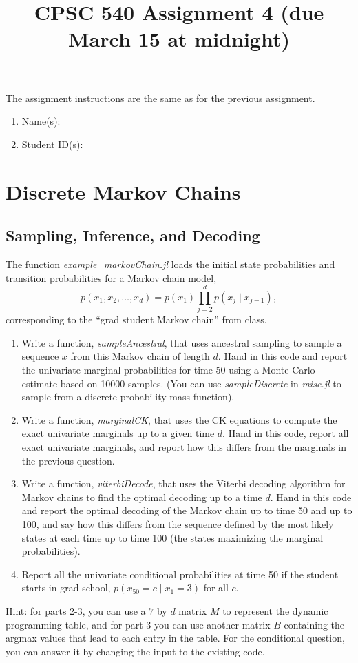 \documentclass{article}
\def\blu#1{{\color{blu}#1}}
\def\cond{\; | \;}
\def\enum#1{\begin{enumerate}#1\end{enumerate}}
\begin{document}
\title{CPSC 540 Assignment 4 (due March 15 at midnight)}
\author{}
\date{}
\maketitle
\vspace{-4em}


The assignment instructions are the same as for the previous assignment.


\blu{\enum{
\item Name(s):
\item Student ID(s):
}}



\section{Discrete Markov Chains}

\subsection{Sampling, Inference, and Decoding}

The function \emph{example\_markovChain.jl} loads the initial state probabilities and transition probabilities for a Markov chain model,
\[
p(x_1,x_2,\dots,x_d) = p(x_1)\prod_{j=2}^{d}{p(x_j\cond x_{j-1})},
\]
corresponding to the ``grad student Markov chain'' from class.

\enum{
\item Write a function, \emph{sampleAncestral}, that uses ancestral sampling to sample a sequence $x$ from this Markov chain of length $d$. \blu{Hand in this code and report the univariate marginal probabilities for time 50 using a Monte Carlo estimate based on 10000 samples.} (You can use \emph{sampleDiscrete} in \emph{misc.jl} to sample from a discrete probability mass function).
\item Write a function, \emph{marginalCK}, that uses the CK equations to compute the exact univariate marginals up to a given time $d$. \blu{Hand in this code, report all exact univariate marginals, and report how this differs from the marginals in the previous question.}
\item Write a function, \emph{viterbiDecode}, that uses the Viterbi decoding algorithm for Markov chains to find the optimal decoding up to a time $d$. \blu{Hand in this code and report the optimal decoding of the Markov chain up to time 50 and up to 100, and say how this differs from the sequence defined by the most likely states at each time up to time 100 (the states maximizing the marginal probabilities)}.
\item \blu{Report all the univariate conditional probabilities at time 50 if the student starts in grad school, $p(x_{50} = c \cond  x_1 = 3)$ for all $c$}.
}
Hint: for parts 2-3, you can use a $7$ by $d$ matrix $M$ to represent the dynamic programming table, and for part 3 you can use another matrix $B$ containing the argmax values that lead to each entry in the table.  For the conditional question, you can answer it by changing the input to the existing code.
\end{document}
